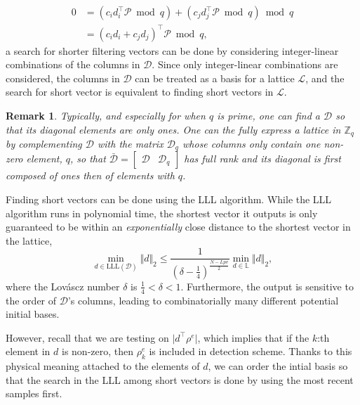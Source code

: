 \documentclass[journal, twoside, web]{ieeecolorpreprint}
\newtheorem{rem}{Remark}
\begin{document}
    \begin{equation*}
    \begin{aligned}
        0 & = (c_id_i^\top\mathcal{P} \bmod q) +(c_jd_j^\top\mathcal{P} \bmod q ) \bmod q \\
        & =  (c_id_i +c_jd_j)^\top\mathcal{P} \bmod q,
        \end{aligned}
    \end{equation*}
a search for shorter filtering vectors can be done by considering integer-linear combinations of the columns in $\mathcal{D}$. Since only integer-linear combinations are considered, the columns in $\mathcal{D}$ can be treated as a basis for a lattice $\mathcal{L}$, and the search for short vector is equivalent to finding short vectors in $\mathcal{L}$.

\begin{rem}
    Typically, and especially for when $q$ is prime, one can find a $\mathcal{D}$ so that its diagonal elements are only ones. One can the fully express a lattice in $\mathbb Z_q$ by complementing $\mathcal D$ with the matrix $\mathcal{D}_q$ whose columns only contain one non-zero element, $q$, so that $\bar{\mathcal{D}}= \begin{bmatrix}
        \mathcal{D} & \mathcal{D}_q
    \end{bmatrix}$ has full rank and its diagonal is first composed of ones then of elements with $q$.
\end{rem}

Finding short vectors can be done using the LLL algorithm. While the LLL algorithm runs in polynomial time, the shortest vector it outputs is only guaranteed to be within an \emph{exponentially} close distance to the shortest vector in the lattice,
    \begin{equation} \label{eq:first_basis_length}
    \min_{d \in \text{LLL}(\mathcal{D})} \Vert d \Vert_2 \leq \frac{1}{\left (\delta-\frac{1}{4}\right )^{\frac{N-Lpv}{2}}} \min_{d \in \mathbb{L}} \Vert d \Vert_2,
\end{equation}
where the Lov\'ascz number $\delta$ is $\frac{1}{4}<\delta < 1$. Furthermore, the output is sensitive to the order of $\mathcal{D}$'s columns, leading to combinatorially many different potential initial bases.

However, recall that we are testing on $\vert d^\top \rho^e \vert$, which implies that if the $k$:th element in $d$ is non-zero, then $\rho_k^e$ is included in detection scheme. Thanks to this physical meaning attached to the elements of $d$, we can order the intial basis so that the search in the LLL among short vectors is done by using the most recent samples first.
\end{document}
